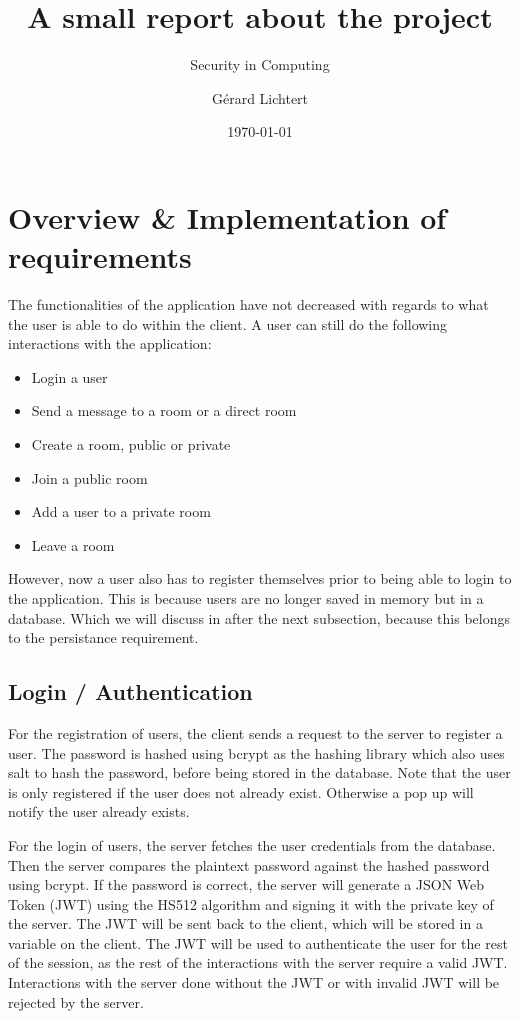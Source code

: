 \documentclass[a4paper]{article}
\title{A small report about the project}
\subtitle{Security in Computing}
\author{Gérard Lichtert}
\date{\today}
\begin{document}
\maketitle
\raggedright{}
\tableofcontents%
\newpage
\section{Overview \& Implementation of requirements}
The functionalities of the application have not decreased with regards to what the user is able to do within the client. A user can still do the following interactions with the application:
\begin{itemize}
    \item Login a user
    \item Send a message to a room or a direct room
    \item Create a room, public or private
    \item Join a public room
    \item Add a user to a private room
    \item Leave a room
\end{itemize}
However, now a user also has to register themselves prior to being able to login to the application. This is because users are no longer saved in memory but in a database. Which we will discuss in after the next subsection, because this belongs to the persistance requirement.

\subsection{Login / Authentication}
For the registration of users, the client sends a request to the server to register a user. The password is hashed using bcrypt as the hashing library which also uses salt to hash the password, before being stored in the database. Note that the user is only registered if the user does not already exist. Otherwise a pop up will notify the user already exists.

For the login of users, the server fetches the user credentials from the database. Then the server compares the plaintext password against the hashed password using bcrypt. If the password is correct, the server will generate a JSON Web Token (JWT) using the HS512 algorithm and signing it with the private key of the server. The JWT will be sent back to the client, which will be stored in a variable on the client. The JWT will be used to authenticate the user for the rest of the session, as the rest of the interactions with the server require a valid JWT. Interactions with the server done without the JWT or with invalid JWT will be rejected by the server.
\end{document}
